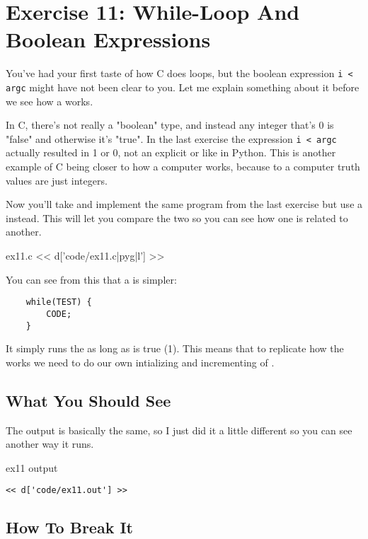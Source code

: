 \chapter{Exercise 11: While-Loop And Boolean Expressions}

You've had your first taste of how C does loops, but the boolean
expression \verb|i < argc| might have not been clear to you.  Let me
explain something about it before we see how a  
works.

In C, there's not really a "boolean" type, and instead any integer
that's 0 is "false" and otherwise it's "true".  In the last exercise
the expression \verb|i < argc| actually resulted in 1 or 0, not 
an explicit  or  like in Python.  This is
another example of C being closer to how a computer works, because
to a computer truth values are just integers.

Now you'll take and implement the same program from the last exercise
but use a  instead.  This will let you compare the
two so you can see how one is related to another.

\begin{code}{ex11.c}
<< d['code/ex11.c|pyg|l'] >>
\end{code}

You can see from this that a  is simpler:

\begin{Verbatim}
    while(TEST) {
        CODE;
    }
\end{Verbatim}

It simply runs the  as long as  is true (1).
This means that to replicate how the  works we need to
do our own intializing and incrementing of .

\section{What You Should See}

The output is basically the same, so I just did it a little different
so you can see another way it runs.

\begin{code}{ex11 output}
\begin{lstlisting}
<< d['code/ex11.out'] >>
\end{lstlisting}
\end{code}

\section{How To Break It}

